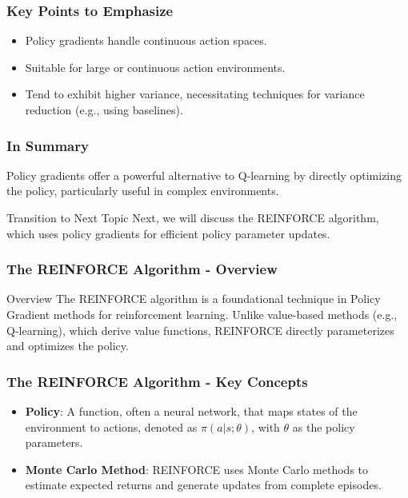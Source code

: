 \documentclass[aspectratio=169]{beamer}
\begin{document}
\begin{frame}[fragile]
    \frametitle{Key Points to Emphasize}
    
    \begin{itemize}
        \item Policy gradients handle continuous action spaces.
        \item Suitable for large or continuous action environments.
        \item Tend to exhibit higher variance, necessitating techniques for variance reduction (e.g., using baselines).
    \end{itemize}

\end{frame}

\begin{frame}[fragile]
    \frametitle{In Summary}
    
    Policy gradients offer a powerful alternative to Q-learning by directly optimizing the policy, particularly useful in complex environments.
    
    \begin{block}{Transition to Next Topic}
        Next, we will discuss the REINFORCE algorithm, which uses policy gradients for efficient policy parameter updates.
    \end{block}
    
\end{frame}

\begin{frame}[fragile]
    \frametitle{The REINFORCE Algorithm - Overview}
    \begin{block}{Overview}
        The REINFORCE algorithm is a foundational technique in Policy Gradient methods for reinforcement learning. 
        Unlike value-based methods (e.g., Q-learning), which derive value functions, REINFORCE directly parameterizes and optimizes the policy.
    \end{block}
\end{frame}

\begin{frame}[fragile]
    \frametitle{The REINFORCE Algorithm - Key Concepts}
    \begin{itemize}
        \item \textbf{Policy}: A function, often a neural network, that maps states of the environment to actions, denoted as $\pi(a|s; \theta)$, with $\theta$ as the policy parameters.
        \item \textbf{Monte Carlo Method}: REINFORCE uses Monte Carlo methods to estimate expected returns and generate updates from complete episodes.
    \end{itemize}
\end{frame}
\end{document}
